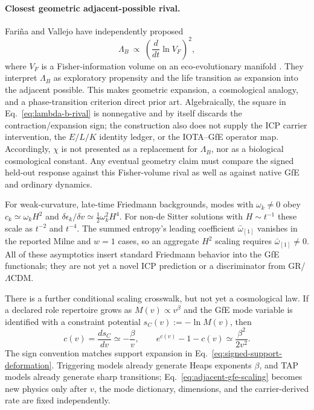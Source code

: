 \paragraph{Closest geometric adjacent-possible rival.}
Fari\~na and Vallejo have independently proposed
\begin{equation}
 \Lambda_B\ \propto\
 \left(\frac{d}{dt}\ln V_F\right)^2,
 \label{eq:lambda-b-rival}
\end{equation}
where $V_F$ is a Fisher-information volume on an eco-evolutionary manifold
\citep{FarinaVallejo2026LambdaB}. They interpret $\Lambda_B$ as exploratory
propensity and the life transition as expansion into the adjacent possible.
This makes geometric expansion, a cosmological analogy, and a phase-transition
criterion direct prior art. Algebraically, the square in
Eq.~\eqref{eq:lambda-b-rival} is nonnegative and by itself discards the
contraction/expansion sign; the construction also does not supply the ICP
carrier intervention, the $E/L/K$ identity ledger, or the IOTA--GfE operator
map. Accordingly, $\chi$ is not presented as a replacement for $\Lambda_B$, nor
as a biological cosmological constant. Any eventual geometry claim must compare
the signed held-out response against this Fisher-volume rival as well as against
native GfE and ordinary dynamics.

For weak-curvature, late-time Friedmann backgrounds, modes with
$\omega_k\neq0$ obey $c_k\simeq\omega_kH^2$ and
$\delta\epsilon_k/\delta v\simeq\tfrac12\omega_k^2H^4$. For non-de Sitter
solutions with $H\sim t^{-1}$ these scale as $t^{-2}$ and $t^{-4}$. The summed
entropy's leading coefficient $\bar\omega_{[1]}$ vanishes in the reported Milne
and $w=1$ cases, so an aggregate $H^2$ scaling requires
$\bar\omega_{[1]}\neq0$. All of these asymptotics insert standard Friedmann
behavior into the GfE functionals; they are not yet a novel ICP prediction or a
discriminator from GR/\(\Lambda\)CDM.

There is a further conditional scaling crosswalk, but not yet a cosmological
law. If a declared role repertoire grows as $M(v)\propto v^\beta$ and the GfE
mode variable is identified with a constraint potential
$s_C(v):=-\ln M(v)$, then
\begin{equation}
 c(v)=\frac{ds_C}{dv}\simeq-\frac{\beta}{v},
 \qquad
 e^{c(v)}-1-c(v)\simeq\frac{\beta^2}{2v^2}.
 \label{eq:adjacent-gfe-scaling}
\end{equation}
The sign convention matches support expansion in
Eq.~\eqref{eq:signed-support-deformation}. Triggering models already generate
Heaps exponents $\beta$, and TAP models already generate sharp transitions;
Eq.~\eqref{eq:adjacent-gfe-scaling} becomes new physics only after $v$, the mode
dictionary, dimensions, and the carrier-derived rate are fixed independently.

